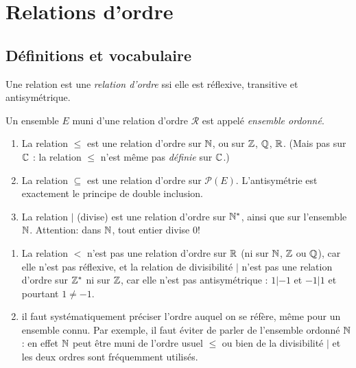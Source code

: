\section{Relations d'ordre}

\subsection{Définitions et vocabulaire}


\begin{definition}
Une relation est une \emph{relation d'ordre} ssi elle est réflexive, transitive et antisymétrique.

Un ensemble $E$ muni d'une relation d'ordre ${\mathcal R}$ est appelé \emph{ensemble ordonné}.
\end{definition}

\begin{exemples}
\begin{enumerate}[label=\alph*)]
\item La relation $\leq$ est une relation d'ordre sur $\mathbb{N}$, ou sur $\mathbb{Z}$, $\mathbb{Q}$, $\mathbb{R}$. (Mais pas sur $\mathbb{C}$ : la relation $\leq$ n'est même pas \emph{définie} sur $\mathbb{C}$.)
\item La relation $\subseteq$ est une relation d'ordre sur $\mathcal P(E)$. L'antisymétrie est exactement le principe de double inclusion.
\item La relation $|$ (\og divise\fg) est une relation d'ordre sur $\mathbb{N}^*$, ainsi que sur l'ensemble $\mathbb{N}$. Attention: dans $\mathbb{N}$, tout entier divise $0$! 
\end{enumerate}
\end{exemples}

\begin{attention}
\begin{enumerate}
\item La relation $<$ n'est pas une relation d'ordre sur $\mathbb{R}$ (ni sur $\mathbb{N}$, $\mathbb{Z}$ ou $\mathbb{Q}$), car elle n'est pas réflexive, et la relation de divisibilité $|$ n'est pas une relation d'ordre sur $\mathbb{Z}^*$ ni sur $\mathbb{Z}$, car elle n'est pas antisymétrique : $1|-1$ et $-1|1$ et pourtant $1\neq -1$.
\item il faut systématiquement préciser l'ordre auquel on se réfère, même pour un ensemble \og connu\fg. Par exemple, il faut éviter de parler de \og l'ensemble ordonné $\mathbb{N}$\fg: en effet $\mathbb{N}$ peut être muni de l'ordre usuel $\leq$ ou bien de la divisibilité $|$ et les deux ordres sont fréquemment utilisés.
\end{enumerate}
\end{attention}


